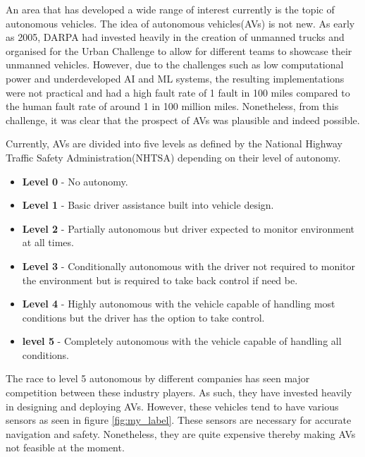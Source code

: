 \newpage

An area that has developed a wide range of interest currently is the topic of autonomous vehicles. The idea of autonomous vehicles(AVs) is not new. As early as 2005, DARPA had invested heavily in the creation of unmanned trucks and organised for the Urban Challenge \cite{buehler2009darpa} to allow for different teams to showcase their unmanned vehicles. However, due to the challenges such as low computational power and underdeveloped AI and ML systems, the resulting implementations were not practical and had a high fault rate of 1 fault in 100 miles compared to the human fault rate of around 1 in 100 million miles. Nonetheless, from this challenge, it was clear that the prospect of AVs was plausible and indeed possible. 

Currently, AVs are divided into five levels as defined by the National Highway Traffic Safety Administration(NHTSA) depending on their level of autonomy. 
\begin{itemize}
	\item \textbf{Level 0} - No autonomy. 
	\item \textbf{Level 1} - Basic driver assistance built into vehicle design.
	\item \textbf{Level 2} - Partially autonomous but driver expected to monitor environment at all times.
	\item \textbf{Level 3} - Conditionally autonomous with the driver not required to monitor the environment but is required to take back control if need be.
	\item \textbf{Level 4} - Highly autonomous with the vehicle capable of handling most conditions but the driver has the option to take control. 
	\item \textbf{level 5} - Completely autonomous with the vehicle capable of handling all conditions.
\end{itemize}

The race to level 5 autonomous by different companies has seen major competition between these industry players. As such, they have invested heavily in designing and deploying AVs. However, these vehicles tend to have various sensors as seen in figure \ref{fig:my_label}. These sensors are necessary for accurate navigation and safety. Nonetheless, they are quite expensive thereby making AVs not feasible at the moment. 




